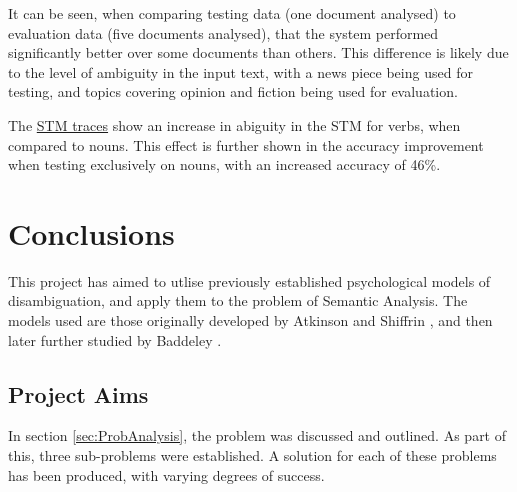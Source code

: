 \documentclass[]{article}
\begin{document}
It can be seen, when comparing testing data (one document analysed) to evaluation data (five documents analysed), that the system performed significantly better over some documents than others. This difference is likely due to the level of ambiguity in the input text, with a news piece being used for testing, and topics covering opinion and fiction being used for evaluation.

The \hyperref[sec:EvTrace]{STM traces} show an increase in abiguity in the STM for verbs, when compared to nouns. This effect is further shown in the accuracy improvement when testing exclusively on nouns, with an increased accuracy of 46\%.



\section{Conclusions}
\label{sec:Conclusions}
This project has aimed to utlise previously established psychological models of disambiguation, and apply them to the problem of Semantic Analysis. The models used are those originally developed by Atkinson and Shiffrin \cite{ControlProcessesSTMAtkinson}, and then later further studied by Baddeley \cite{MemoryBaddeleyEysenkAnderson}.

\subsection{Project Aims}
\label{ConcAims}
In section \ref{sec:ProbAnalysis}, the problem was discussed and outlined. As part of this, three sub-problems were established. A solution for each of these problems has been produced, with varying degrees of success.
\end{document}
